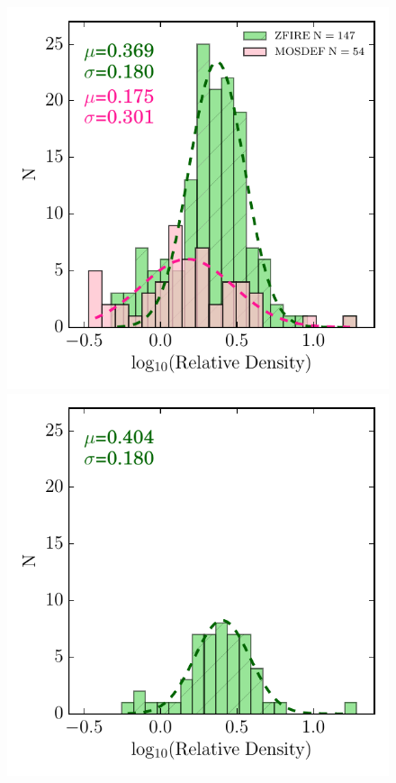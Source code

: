 \documentclass[iop]{emulateapj}
\begin{document}
\begin{figure}
\includegraphics[scale=0.87]{figures/density_hist_all.pdf}
\includegraphics[scale=0.87]{figures/density_hist_cluster.pdf}

\end{figure}
\end{document}

